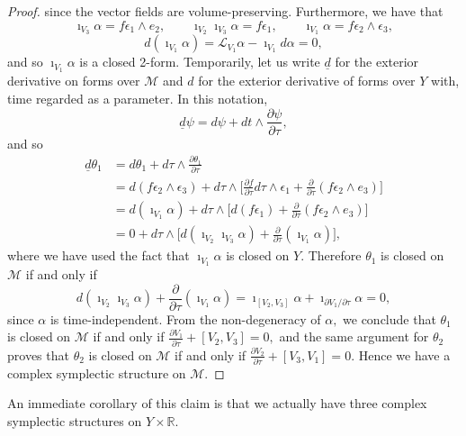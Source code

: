 \documentclass[a4paper,onecolumn,12pt]{article}
\theoremstyle{definition}
\theoremstyle{remark}
\newcommand{\e}{\epsilon}
\newcommand{\dd}[2]{\frac{\partial #1}{\partial #2}}
\newcommand{\R}{\mathbb{R}}
\begin{document}
\begin{proof}
	since the vector fields are volume-preserving. Furthermore, we have that 
	\begin{equation*}
	\imath_{V_{3}}\alpha = f\e_{1}\wedge e_{2},\qquad \imath_{V_{2}}\imath_{V_{3}}\alpha = f\e_{1},\qquad \imath_{V_{1}}\alpha=f\e_{2}\wedge\e_{3},
	\end{equation*}
	\begin{equation*}
	d(\imath_{V_{1}}\alpha) = \mathcal{L}_{V_{1}}\alpha - \imath_{V_{1}}d\alpha = 0,
	\end{equation*}
	and so $\imath_{V_{1}}\alpha$ is a closed 2-form. Temporarily, let us write $\underline{d}$ for the exterior derivative on forms over $\mathcal{M}$ and $d$ for the exterior derivative of forms over $Y$ with, time regarded as a parameter. In this notation,
	\begin{equation*}
	\underline{d}\psi = d\psi + dt\wedge\dd{\psi}{\tau},
	\end{equation*}
	and so
	\begin{align*}
	\underline{d}\theta_{1} &= d\theta_{1} + d\tau \wedge \dd{\theta_{1}}{\tau}\\
	&= d(f\e_{2}\wedge\e_{3}) + d\tau\wedge \Bigg[\dd{f}{\tau} d\tau\wedge\e_{1} + \dd{}{\tau}(f \e_{2} \wedge e_{3})\Bigg]\\
	&= d(\imath_{V_{1}}\alpha) + d\tau\wedge \Bigg[d(f\e_{1}) + \dd{}{\tau}(f \e_{2} \wedge e_{3})\Bigg]\\
	&= 0 + d\tau\wedge \Bigg[d(\imath_{V_{2}}\imath_{V_{3}}\alpha) + \dd{}{\tau}(\imath_{V_{1}}\alpha)\Bigg],
	\end{align*}
	where we have used the fact that $\imath_{V_{1}}\alpha$ is closed on $Y.$ Therefore $\theta_{1}$ is closed on $\mathcal{M}$ if and only if
	\begin{equation*}
	d(\imath_{V_{2}}\imath_{V_{3}}\alpha) + \dd{}{\tau}(\imath_{V_{1}}\alpha)
	= \imath_{[V_{2},V_{3}]}\alpha + \imath_{\partial V_{1}/\partial\tau}\alpha
	= 0,
	\end{equation*}
	since $\alpha$ is time-independent. From the non-degeneracy of $\alpha,$ we conclude that $\theta_{1}$ is closed on $\mathcal{M}$ if and only if $\dd{V_{1}}{\tau} + [V_{2},V_{3}] = 0,$ and the same argument for $\theta_{2}$ proves that $\theta_{2}$ is closed on $\mathcal{M}$ if and only if $\dd{V_{2}}{\tau} + [V_{3},V_{1}] = 0.$ Hence we have a complex symplectic structure on $\mathcal{M}.$
\end{proof}
An immediate corollary of this claim is that we actually have three complex symplectic structures on $Y\times\R.$\\
\end{document}
